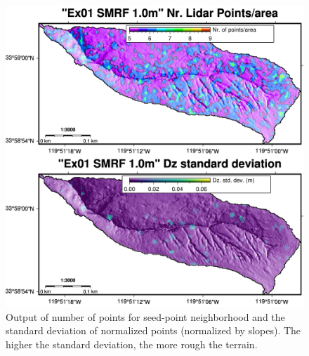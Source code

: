 \documentclass[a4paperpaper,,tablecaptionabove]{scrartcl}
\begin{document}
\begin{figure}
\centering
\includegraphics[width=\textwidth,height=0.9\textheight]{./tex2pdf.-e6884bf2dada0f3b/04ead4fa949555f67585055846aea76f7764f0d7.png}
\caption{Output of number of points for seed-point neighborhood and the
standard deviation of normalized points (normalized by slopes). The
higher the standard deviation, the more rough the terrain.
\label{Fig:Ex01_cl2_1.0m_2panel_NRLIDARPTS_DZ_STDDEV}}
\end{figure}
\end{document}
